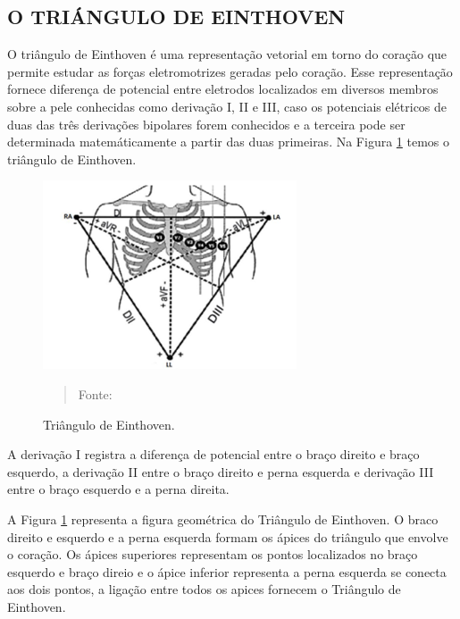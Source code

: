 \documentclass[12pt, a4paper]{article}
\begin{document}
\subsection{O TRIÁNGULO DE EINTHOVEN }

\hspace*{0.8cm}O triângulo de Einthoven é uma representação vetorial em torno do coração que permite estudar as forças eletromotrizes geradas pelo coração. Esse representação fornece  diferença de potencial entre eletrodos localizados em diversos membros sobre a pele conhecidas como derivação I, II e III, caso os potenciais elétricos de duas das três derivações bipolares forem conhecidos e a terceira pode ser determinada matemáticamente a partir das duas primeiras. Na Figura \ref{fig:jup} temos o triângulo de Einthoven.

\begin{figure}[!htpb]
\begin{center}
			\caption{Triângulo de Einthoven.}
			\includegraphics[width=.5\textwidth]{Figuras/triangulo.png}
            \vspace*{\fill} 
            \begin{quote} 
            \centering 
            Fonte: \cite{souza}
            \end{quote}
            \vspace*{\fill}
			\label{fig:jup}
\end{center}
\end{figure}

A derivação I registra a diferença de potencial entre o braço direito e braço esquerdo, a derivação II entre o braço direito e perna esquerda e derivação III entre o braço esquerdo e a perna direita. 

A Figura \ref{fig:jup} representa a figura geométrica do Triângulo de Einthoven. O braco direito e esquerdo e a perna esquerda formam os ápices do triângulo que envolve o coração. Os ápices superiores representam os pontos localizados no braço esquerdo e braço direio e o ápice inferior representa a perna esquerda se conecta aos dois pontos, a ligação entre todos os apices fornecem o Triângulo de Einthoven.
\end{document}
